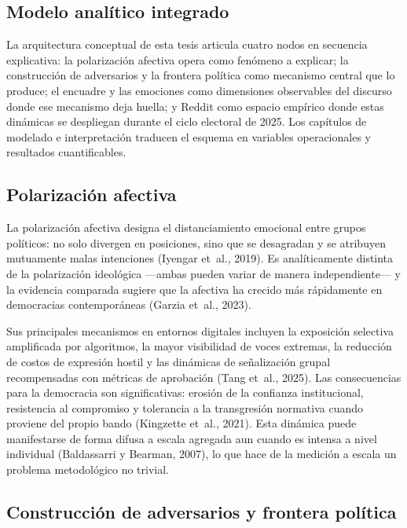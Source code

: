 \documentclass[
  letterpaper,
  numbers=noendperiod,
  fontsize=11pt,
  DIV=12,
  titlepage=false]{scrreprt}
\begin{document}
\subsection{Modelo analítico
integrado}\label{modelo-analuxedtico-integrado}

La arquitectura conceptual de esta tesis articula cuatro nodos en
secuencia explicativa: la polarización afectiva opera como fenómeno a
explicar; la construcción de adversarios y la frontera política como
mecanismo central que lo produce; el encuadre y las emociones como
dimensiones observables del discurso donde ese mecanismo deja huella; y
Reddit como espacio empírico donde estas dinámicas se despliegan durante
el ciclo electoral de 2025. Los capítulos de modelado e interpretación
traducen el esquema en variables operacionales y resultados
cuantificables.

\subsection{Polarización afectiva}\label{polarizaciuxf3n-afectiva}

La polarización afectiva designa el distanciamiento emocional entre
grupos políticos: no solo divergen en posiciones, sino que se desagradan
y se atribuyen mutuamente malas intenciones (Iyengar et~al., 2019). Es
analíticamente distinta de la polarización ideológica ---ambas pueden
variar de manera independiente--- y la evidencia comparada sugiere que
la afectiva ha crecido más rápidamente en democracias contemporáneas
(Garzia et~al., 2023).

Sus principales mecanismos en entornos digitales incluyen la exposición
selectiva amplificada por algoritmos, la mayor visibilidad de voces
extremas, la reducción de costos de expresión hostil y las dinámicas de
señalización grupal recompensadas con métricas de aprobación (Tang
et~al., 2025). Las consecuencias para la democracia son significativas:
erosión de la confianza institucional, resistencia al compromiso y
tolerancia a la transgresión normativa cuando proviene del propio bando
(Kingzette et~al., 2021). Esta dinámica puede manifestarse de forma
difusa a escala agregada aun cuando es intensa a nivel individual
(Baldassarri y Bearman, 2007), lo que hace de la medición a escala un
problema metodológico no trivial.

\subsection{Construcción de adversarios y frontera
política}\label{construcciuxf3n-de-adversarios-y-frontera-poluxedtica}
\end{document}
